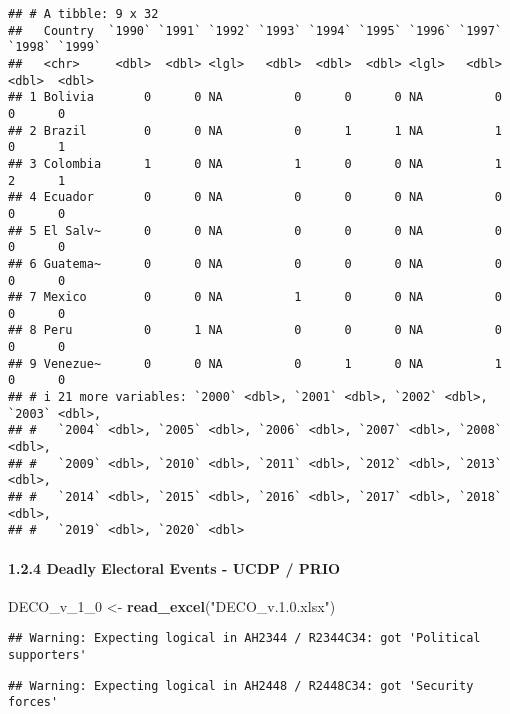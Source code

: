 \documentclass[
  11pt,
]{article}
\newenvironment{Shaded}{\begin{snugshade}}{\end{snugshade}}
\newcommand{\FunctionTok}[1]{\textcolor[rgb]{0.13,0.29,0.53}{\textbf{#1}}}
\newcommand{\NormalTok}[1]{#1}
\newcommand{\OtherTok}[1]{\textcolor[rgb]{0.56,0.35,0.01}{#1}}
\newcommand{\StringTok}[1]{\textcolor[rgb]{0.31,0.60,0.02}{#1}}
\begin{document}
\begin{verbatim}
## # A tibble: 9 x 32
##   Country  `1990` `1991` `1992` `1993` `1994` `1995` `1996` `1997` `1998` `1999`
##   <chr>     <dbl>  <dbl> <lgl>   <dbl>  <dbl>  <dbl> <lgl>   <dbl>  <dbl>  <dbl>
## 1 Bolivia       0      0 NA          0      0      0 NA          0      0      0
## 2 Brazil        0      0 NA          0      1      1 NA          1      0      1
## 3 Colombia      1      0 NA          1      0      0 NA          1      2      1
## 4 Ecuador       0      0 NA          0      0      0 NA          0      0      0
## 5 El Salv~      0      0 NA          0      0      0 NA          0      0      0
## 6 Guatema~      0      0 NA          0      0      0 NA          0      0      0
## 7 Mexico        0      0 NA          1      0      0 NA          0      0      0
## 8 Peru          0      1 NA          0      0      0 NA          0      0      0
## 9 Venezue~      0      0 NA          0      1      0 NA          1      0      0
## # i 21 more variables: `2000` <dbl>, `2001` <dbl>, `2002` <dbl>, `2003` <dbl>,
## #   `2004` <dbl>, `2005` <dbl>, `2006` <dbl>, `2007` <dbl>, `2008` <dbl>,
## #   `2009` <dbl>, `2010` <dbl>, `2011` <dbl>, `2012` <dbl>, `2013` <dbl>,
## #   `2014` <dbl>, `2015` <dbl>, `2016` <dbl>, `2017` <dbl>, `2018` <dbl>,
## #   `2019` <dbl>, `2020` <dbl>
\end{verbatim}

\paragraph{1.2.4 Deadly Electoral Events - UCDP /
PRIO}\label{deadly-electoral-events---ucdp-prio}

\begin{Shaded}
\begin{Highlighting}[]
\NormalTok{DECO\_v\_1\_0 }\OtherTok{\textless{}{-}} \FunctionTok{read\_excel}\NormalTok{(}\StringTok{"DECO\_v.1.0.xlsx"}\NormalTok{)}
\end{Highlighting}
\end{Shaded}

\begin{verbatim}
## Warning: Expecting logical in AH2344 / R2344C34: got 'Political supporters'
\end{verbatim}

\begin{verbatim}
## Warning: Expecting logical in AH2448 / R2448C34: got 'Security forces'
\end{verbatim}
\end{document}

